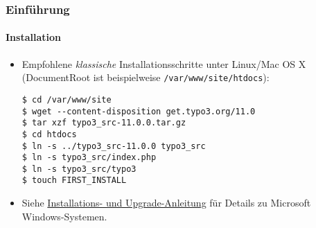 %

\begin{frame}[fragile]
	\frametitle{Einführung}
	\framesubtitle{Installation}


	\begin{itemize}
		\item Empfohlene \textit{klassische} Installationsschritte unter Linux/Mac OS X\newline
			(DocumentRoot ist beispielweise \texttt{/var/www/site/htdocs}):
\begin{lstlisting}
$ cd /var/www/site
$ wget --content-disposition get.typo3.org/11.0
$ tar xzf typo3_src-11.0.0.tar.gz
$ cd htdocs
$ ln -s ../typo3_src-11.0.0 typo3_src
$ ln -s typo3_src/index.php
$ ln -s typo3_src/typo3
$ touch FIRST_INSTALL
\end{lstlisting}

		\item Siehe \href{https://docs.typo3.org/m/typo3/guide-installation/master/en-us/}{Installations- und Upgrade-Anleitung}
			für Details zu Microsoft Windows-Systemen.

	\end{itemize}
\end{frame}

